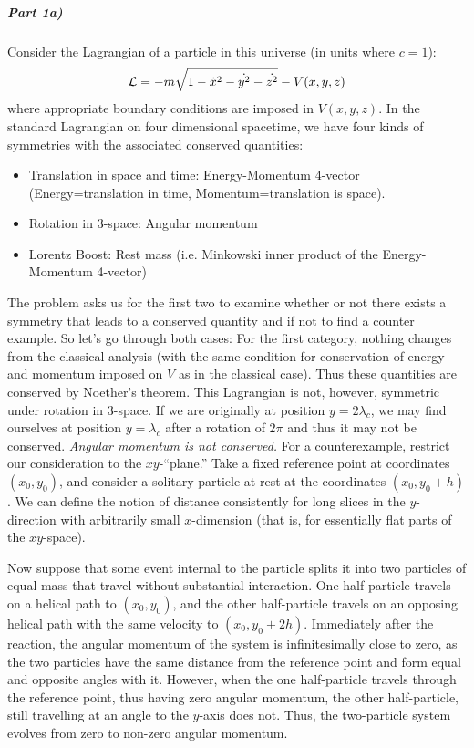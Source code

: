 \subparagraph*{Part 1a)}
Consider the Lagrangian of a particle in this universe (in units where $c=1$):
\[ \mathcal{L} = -m\sqrt{1-\dot{x}^2-\dot{y^2}-\dot{z^2}} - V(x,y,z)  \]
where appropriate boundary conditions are imposed in $V(x,y,z)$.
In the standard Lagrangian on four dimensional spacetime, we have four kinds of symmetries with the associated conserved quantities:
\begin{itemize}
\item Translation in space and time: Energy-Momentum 4-vector (Energy=translation in time, Momentum=translation is space).
\item Rotation in 3-space: Angular momentum
\item Lorentz Boost: Rest mass (i.e. Minkowski inner product of the Energy-Momentum 4-vector)
\end{itemize}
The problem asks us for the first two to examine whether or not there exists a symmetry that leads to a conserved quantity and if not to find a counter example. So let's go through both cases:
For the first category, nothing changes from the classical analysis (with the same condition for conservation of energy and momentum imposed on $V$ as in the classical case). Thus these quantities are conserved by Noether's theorem. This Lagrangian is not, however, symmetric under rotation in 3-space. If we are originally at position $y=2\lambda_c$, we may find ourselves at position $y=\lambda_c$ after a rotation of $2\pi$ and thus it may not be conserved. 
\emph{Angular momentum is not conserved.}  For a counterexample, restrict our consideration to the $xy$-``plane.''  Take a fixed reference point at coordinates $(x_0, y_0)$, and consider a solitary particle at rest at the coordinates $(x_0, y_0 + h)$.  We can define the notion of distance consistently for long slices in the $y$-direction with arbitrarily small $x$-dimension (that is, for essentially flat parts of the $xy$-space).

Now suppose that some event internal to the particle splits it into two particles of equal mass that travel without substantial interaction.  One half-particle travels on a helical path to $(x_0, y_0)$, and the other half-particle travels on an opposing helical path with the same velocity to $(x_0, y_0 + 2h)$.  Immediately after the reaction, the angular momentum of the system is infinitesimally close to zero, as the two particles have the same distance from the reference point and form equal and opposite angles with it.  However, when the one half-particle travels through the reference point, thus having zero angular momentum, the other half-particle, still travelling at an angle to the $y$-axis does not.  Thus, the two-particle system evolves from zero to non-zero angular momentum.

